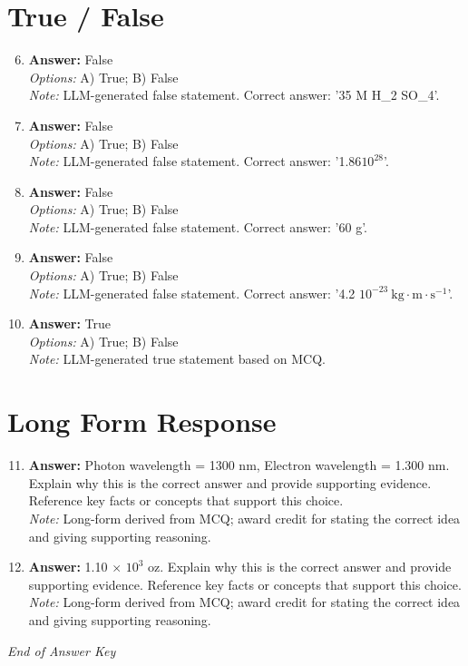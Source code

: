 \documentclass[12pt]{article}
\begin{document}
\section*{True / False}
\begin{enumerate}[label=\arabic*.]
\setcounter{enumi}{5}
\item \textbf{Answer:} False
\\ \textit{Options:} A) True; B) False
\\ \textit{Note:} LLM-generated false statement. Correct answer: '35 M H\_2 SO\_4'.
\item \textbf{Answer:} False
\\ \textit{Options:} A) True; B) False
\\ \textit{Note:} LLM-generated false statement. Correct answer: '1.86$10^{28} $'.
\item \textbf{Answer:} False
\\ \textit{Options:} A) True; B) False
\\ \textit{Note:} LLM-generated false statement. Correct answer: '60 g'.
\item \textbf{Answer:} False
\\ \textit{Options:} A) True; B) False
\\ \textit{Note:} LLM-generated false statement. Correct answer: '4.2 $10^{-23} \mathrm{~kg} \cdot \mathrm{m} \cdot \mathrm{s}^{-1}$'.
\item \textbf{Answer:} True
\\ \textit{Options:} A) True; B) False
\\ \textit{Note:} LLM-generated true statement based on MCQ.
\end{enumerate}

\section*{Long Form Response}
\begin{enumerate}[label=\arabic*.]
\setcounter{enumi}{10}
\item \textbf{Answer:} Photon wavelength = 1300 nm, Electron wavelength = 1.300 nm. Explain why this is the correct answer and provide supporting evidence. Reference key facts or concepts that support this choice.
\\ \textit{Note:} Long-form derived from MCQ; award credit for stating the correct idea and giving supporting reasoning.
\item \textbf{Answer:} 1.10 \ensuremath{\times} $10^3$ oz. Explain why this is the correct answer and provide supporting evidence. Reference key facts or concepts that support this choice.
\\ \textit{Note:} Long-form derived from MCQ; award credit for stating the correct idea and giving supporting reasoning.
\end{enumerate}

\vfill
\noindent\textit{End of Answer Key}
\end{document}
